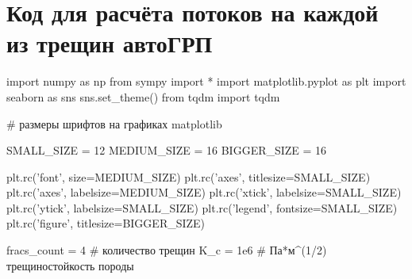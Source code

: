 \chapter{Код для расчёта потоков на каждой из трещин автоГРП}\label{appendix-rates-at-fractures}

\begin{pythoncode}
import numpy as np
from sympy import *
import matplotlib.pyplot as plt
import seaborn as sns
sns.set_theme()
from tqdm import tqdm
\end{pythoncode}


\begin{pythoncode}
# размеры шрифтов на графиках matplotlib

SMALL_SIZE = 12
MEDIUM_SIZE = 16
BIGGER_SIZE = 16

plt.rc('font', size=MEDIUM_SIZE)
plt.rc('axes', titlesize=SMALL_SIZE)
plt.rc('axes', labelsize=MEDIUM_SIZE)
plt.rc('xtick', labelsize=SMALL_SIZE)
plt.rc('ytick', labelsize=SMALL_SIZE)
plt.rc('legend', fontsize=SMALL_SIZE)
plt.rc('figure', titlesize=BIGGER_SIZE)
\end{pythoncode}


\begin{pythoncode}
fracs_count = 4  # количество трещин
K_c = 1e6  # Па*м^(1/2) трещиностойкость породы
\end{pythoncode}


